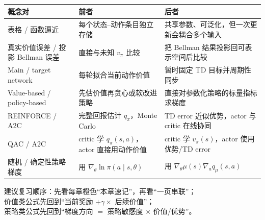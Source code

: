 \documentclass[11pt,a4paper,fontset=fandol]{ctexart}
\begin{document}
\begin{center}
\begin{tabularx}{\textwidth}{
  >{\raggedright\arraybackslash}p{}
  >{\raggedright\arraybackslash}p{}
  X}
\toprule
概念对 & 前者 & 后者\\
\midrule
表格 / 函数逼近 &
每个状态--动作条目独立存储 &
共享参数、可泛化，但一次更新会耦合多个输入\\
真实价值误差 / 投影 Bellman 误差 &
直接与未知 \(v_\pi\) 比较 &
把 Bellman 结果投影回可表示空间后比较\\
Main / target network &
每轮拟合当前动作价值 &
暂时固定 TD 目标并周期性同步\\
Value-based / policy-based &
先估价值再贪心或软改进策略 &
直接对参数化策略的标量指标求梯度\\
REINFORCE / A2C &
完整回报估计 \(q_\pi\)，Monte Carlo &
TD error 近似优势，actor 与 critic 在线协同\\
QAC / A2C &
critic 学 \(q_\pi(s,a)\)，actor 直接用动作价值 &
critic 学 \(v_\pi(s)\)，actor 使用优势/TD error\\
随机 / 确定性策略梯度 &
用 \(\nabla_\theta\ln\pi(a\mid s,\theta)\) &
用 \(\nabla_\theta\mu(s)\nabla_a q_\mu(s,a)\)\\
\bottomrule
\end{tabularx}
\end{center}

\vfill
\begin{center}
\color{textgray}
\small
建议复习顺序：先看每章橙色“本章速记”，再看“一页串联”；\\
价值类公式先回到“当前奖励 \(+\gamma\times\) 后续价值”；\\
策略类公式先回到“梯度方向 \(=\) 策略敏感度 \(\times\) 价值/优势”。
\end{center}
\end{document}
